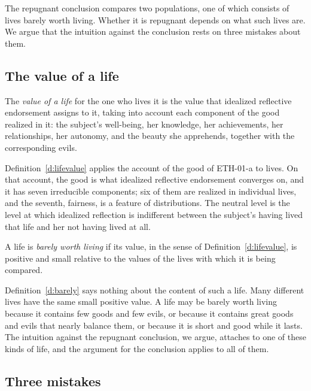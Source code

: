 \documentclass{situationist-preprint}
\begin{document}
The repugnant conclusion compares two populations, one of which consists of lives barely worth living. Whether it is repugnant depends on what such lives are. We argue that the intuition against the conclusion rests on three mistakes about them.

\subsection{The value of a life}

\begin{definition}\label{d:lifevalue}
The \emph{value of a life} for the one who lives it is the value that idealized reflective endorsement assigns to it, taking into account each component of the good realized in it: the subject's well-being, her knowledge, her achievements, her relationships, her autonomy, and the beauty she apprehends, together with the corresponding evils.
\end{definition}

Definition~\ref{d:lifevalue} applies the account of the good of ETH-01-a to lives. On that account, the good is what idealized reflective endorsement converges on, and it has seven irreducible components; six of them are realized in individual lives, and the seventh, fairness, is a feature of distributions. The neutral level is the level at which idealized reflection is indifferent between the subject's having lived that life and her not having lived at all.

\begin{definition}\label{d:barely}
A life is \emph{barely worth living} if its value, in the sense of Definition~\ref{d:lifevalue}, is positive and small relative to the values of the lives with which it is being compared.
\end{definition}

Definition~\ref{d:barely} says nothing about the content of such a life. Many different lives have the same small positive value. A life may be barely worth living because it contains few goods and few evils, or because it contains great goods and evils that nearly balance them, or because it is short and good while it lasts. The intuition against the repugnant conclusion, we argue, attaches to one of these kinds of life, and the argument for the conclusion applies to all of them.

\subsection{Three mistakes}
\end{document}
